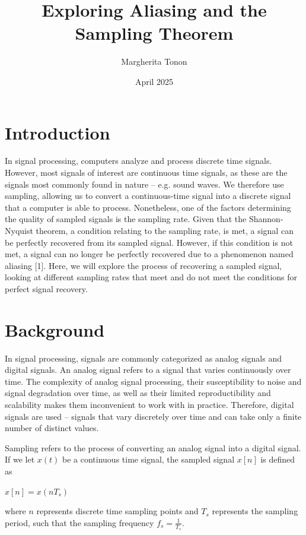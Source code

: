 \documentclass{article}
\title{Exploring Aliasing and the Sampling Theorem} %
\author{Margherita Tonon}
\date{April 2025}
\begin{document}
\maketitle

\section{Introduction}
In signal processing, computers analyze and process discrete time signals. 
However, most signals of interest are continuous time signals, as these are the signals most commonly found in nature -- e.g. sound waves.
We therefore use sampling, allowing us to convert a continuous-time signal into a discrete signal that a computer is able to process.
Nonetheless, one of the factors determining the quality of sampled signals is the sampling rate. %
Given that the Shannon-Nyquist theorem, a condition relating to the sampling rate, is met, a signal can be perfectly recovered from its sampled signal. 
However, if this condition is not met, a signal can no longer be perfectly recovered due to a phenomenon named aliasing [1].
Here, we will explore the process of recovering a sampled signal, looking at different sampling rates that meet and do not meet the conditions for perfect signal recovery.


\section{Background}
In signal processing, signals are commonly categorized as analog signals and digital signals.
An analog signal refers to a signal that varies continuously over time. 
The complexity of analog signal processing, their susceptibility to noise and signal degradation over time, as well as their limited reproductibility and scalability makes them inconvenient to work with in practice. 
Therefore, digital signals are used -- signals that vary discretely over time and can take only a finite number of distinct values.

Sampling refers to the process of converting an analog signal into a digital signal. If we let $x(t)$ be a continuous time signal, the sampled signal $x[n]$ is defined as
\begin{center}
    \begin{math}
        x[n] = x(nT_s)
    \end{math}  
\end{center}
where $n$ represents discrete time sampling points and $T_s$ represents the sampling period, such that the sampling frequency $f_s = \frac{1}{T_s}$.
\end{document}
